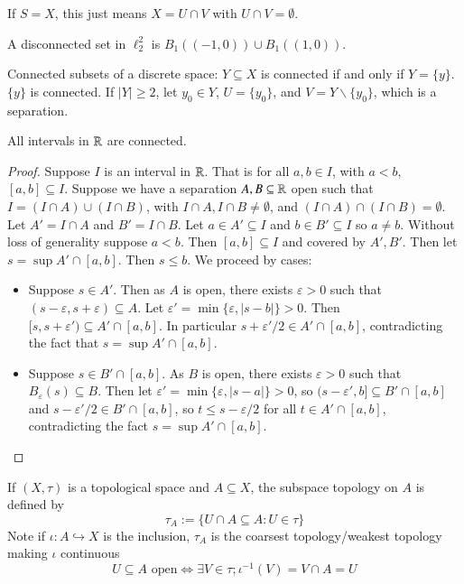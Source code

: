 If $S = X$, this just means $X = U\cap V$ with $U\cap V = \emptyset$.

\begin{example}
    A disconnected set in $\ell_2^2$ is $B_1((-1,0)) \cup B_1((1,0))$.
\end{example}

\begin{example}
    Connected subsets of a discrete space: $Y \subseteq X$ is connected if and only if $Y = \{y\}$. $\{y\}$ is connected. If $|Y| \geq 2$, let $y_0 \in Y$, $U = \{y_0\}$, and $V = Y\backslash \{y_0\}$, which is a separation.
\end{example}


\begin{proposition}\label{prop:3.1.6}
    All intervals in $\mathbb R$ are connected.
\end{proposition}
\begin{proof}
    Suppose $I$ is an interval in $\mathbb R$. That is for all $a, b \in I$, with $a < b$, $[a,b] \subseteq I$. Suppose we have a separation $A, B \subseteq \mathbb R$ open such that $I = (I\cap A)\cup(I\cap B)$, with $I\cap A,I\cap B \neq \emptyset$, and $(I\cap A)\cap (I\cap B) = \emptyset$. Let $A' = I\cap A$ and $B' = I\cap B$. Let $a \in A' \subseteq I$ and $b \in B' \subseteq I$ so $a \neq b$. Without loss of generality suppose $a < b$. Then $[a,b] \subseteq I$ and covered by $A',B'$. Then let $s = \sup A'\cap [a,b]$. Then $s \leq b$. We proceed by cases:
    \begin{itemize}
        \item Suppose $s \in A'$. Then as $A$ is open, there exists $\varepsilon > 0$ such that $(s-\varepsilon,s+\varepsilon) \subseteq A$. Let $\varepsilon' = \min\{\varepsilon,|s-b|\} > 0$. Then $[s,s+\varepsilon') \subseteq A'\cap [a,b]$. In particular $s+\varepsilon'/2 \in A'\cap [a,b]$, contradicting the fact that $s = \sup A'\cap [a,b]$.
        \item Suppose $s \in B'\cap [a,b]$. As $B$ is open, there exists $\varepsilon > 0$ such that $B_{\varepsilon}(s) \subseteq B$. Then let $\varepsilon' = \min\{\varepsilon,|s-a|\} > 0$, so $(s-\varepsilon',b] \subseteq B'\cap [a,b]$ and $s - \varepsilon'/2 \in B'\cap [a,b]$, so $t \leq s-\varepsilon/2$ for all $t \in A'\cap [a,b]$, contradicting the fact $s = \sup A'\cap [a,b]$.
    \end{itemize}
\end{proof}

\begin{definition}
    If $(X,\tau)$ is a topological space and $A \subseteq X$, the subspace topology on $A$ is defined by \begin{equation*}
        \tau_A := \{U\cap A \subseteq A: U \in \tau\}
    \end{equation*}
    Note if $\iota:A\hookrightarrow X$ is the inclusion, $\tau_A$ is the coarsest topology/weakest topology making $\iota$ continuous $$U \subseteq A\text{ open} \iff \exists V \in \tau;\iota^{-1}(V) = V\cap A = U$$
\end{definition}

